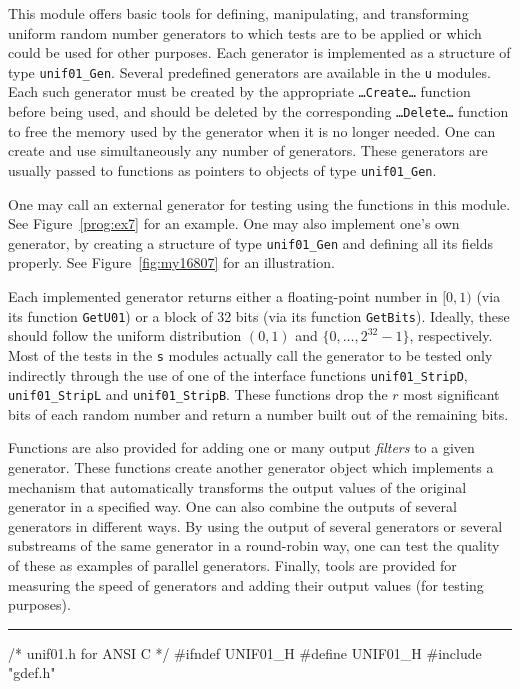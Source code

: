 
This module offers basic tools for defining, manipulating, and
transforming uniform random number generators to which tests are 
to be applied or which could be used for other purposes.
Each generator is implemented as a
structure of type {\tt unif01\_Gen}. 
Several predefined generators are available in the {\tt u} modules.
Each such generator must be created by the appropriate 
{\tt \ldots Create\ldots} function before being used, and should
be deleted by the corresponding {\tt \ldots Delete\ldots} function
to free the memory used by the generator when it is no longer needed.
One can create and use simultaneously any number of generators. 
These generators are usually passed to functions as pointers to
objects of type {\tt unif01\_Gen}.

One may call an external generator for testing using the functions in
this module. See Figure~\ref{prog:ex7} for an example.
One may also implement one's own generator, by creating a structure of 
type {\tt unif01\_Gen} and defining all its fields properly.
See Figure~\ref{fig:my16807} for an illustration.

Each implemented generator returns either a floating-point 
number in $[0, 1)$ (via its function {\tt GetU01}) 
or a block of 32 bits (via its function {\tt GetBits}).
Ideally, these should follow the uniform distribution $(0,1)$
and $\{0,\dots,2^{32}-1\}$, respectively.
Most of the tests in the {\tt s} modules actually call the generator
to be tested only indirectly through the use of one of the interface 
functions {\tt unif01\_StripD},
 {\tt unif01\_StripL} and  {\tt unif01\_StripB}.
These functions drop the $r$ most significant bits of each random number 
and return a number built out of the remaining bits.

Functions are also provided for adding one or many output {\em filters\/} 
to a given generator. These functions create another generator
object which implements a mechanism that automatically
transforms the output values of the original generator in a specified way.
One can also combine the outputs of several generators in different ways.
By using the output of several generators or several substreams of the
same generator in a round-robin way, one can test the quality of these as 
examples of parallel generators.
Finally, tools are provided for measuring the speed of generators
and adding their output values (for testing purposes).



\bigskip\hrule
\code\hide
/*  unif01.h  for ANSI C  */
#ifndef UNIF01_H
#define UNIF01_H
\endhide
#include "gdef.h"
\endcode


